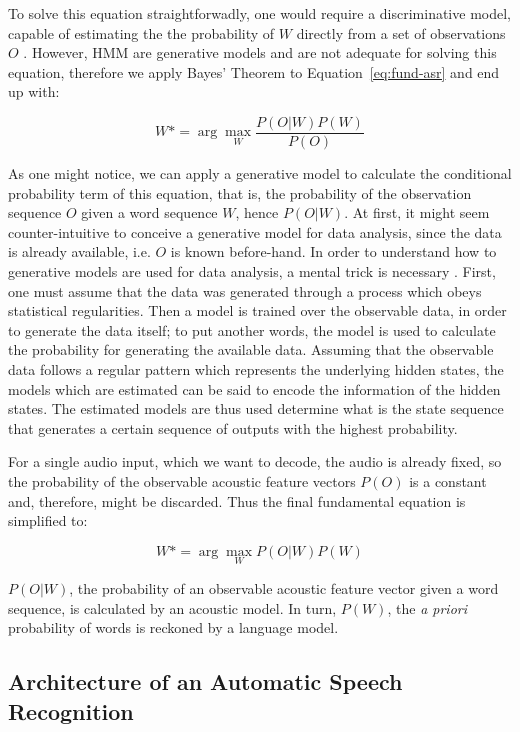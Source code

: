 To solve this equation straightforwadly, one would require a discriminative model,
capable of estimating the the probability of $W$ directly from a set of observations $O$ \cite{Gales2008}.
However, \ac{HMM} are generative models and are not adequate for solving this equation,
therefore we apply Bayes' Theorem to Equation~\ref{eq:fund-asr} and end up with:

\begin{equation}
W*= \arg\max_{W}\frac{P(O|W)P(W)}{P(O)}
\end{equation}

As one might notice, we can apply a generative model to calculate the conditional probability term of this
equation, that is, the probability of the observation sequence $O$ given a word sequence $W$, hence $P(O|W)$.
At first, it might seem counter-intuitive to conceive a generative model for data analysis, since the 
data is already available, i.e. $O$ is known before-hand. In order to understand how to generative models are used for data analysis, a mental trick is necessary \cite{Fink2014}. First, one must assume that the data was generated through a process which obeys statistical regularities. Then a model is trained over the observable data, in order to generate the data itself; to put another words, the model is used to calculate the probability for generating the available data. Assuming that the observable data follows a regular pattern which represents the underlying hidden states, the models which are estimated can be said to encode the information of the hidden states. The estimated models are thus used determine what is the state sequence that generates a certain sequence of outputs with the highest probability.

For a single audio input, which we want to decode, the audio is already fixed, so the 
probability of the observable acoustic feature vectors $P(O)$ is a constant and, therefore, 
might be discarded. Thus the final fundamental equation is simplified to:

\begin{equation}
W*= \arg\max_{W}P(O|W)P(W)
\end{equation}

$P(O|W)$, the probability of an observable acoustic feature vector given a word sequence, is calculated by 
an acoustic model. In turn, $P(W)$, the \emph{a priori} probability of words is reckoned by a language model.

\subsection{Architecture of an Automatic Speech Recognition}

